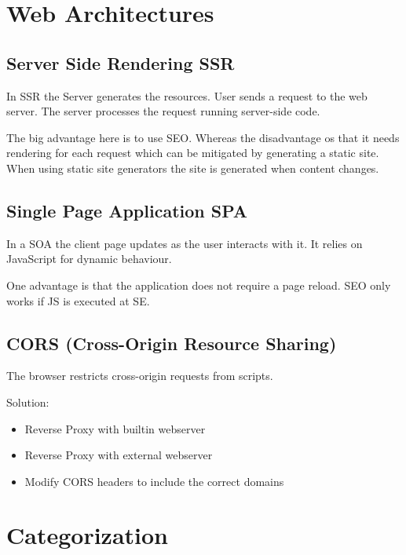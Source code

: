 \documentclass[../Main.tex]{subfiles}
\begin{document}
\section{Web Architectures}
\subsection{Server Side Rendering SSR}
In SSR the Server generates the resources.
User sends a request to the web server.
The server processes the request running server-side code.

The big advantage here is to use SEO.
Whereas the disadvantage os that it needs rendering for each request which
can be mitigated by generating a static site.
When using static site generators the site is generated when content changes.

\subsection{Single Page Application SPA}
In a SOA the client page updates as the user interacts with it.
It relies on JavaScript for dynamic behaviour.

One advantage is that the application does not require a page reload.
SEO only works if JS is executed at SE.

\subsection{CORS (Cross-Origin Resource Sharing)}
The browser restricts cross-origin requests from scripts.

Solution:
\begin{itemize}
    \item Reverse Proxy with builtin webserver
    \item Reverse Proxy with external webserver
    \item Modify CORS headers to include the correct domains
\end{itemize}


\section{Categorization}
\end{document}
